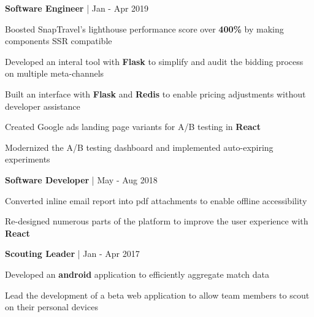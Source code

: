\begin{cventries}

\cventry
{\textbf{Software Engineer} | \color{awesome}{SnapTravel}}
{Jan - Apr 2019} %
{ %
\begin{cvitems}
\item {Boosted SnapTravel's lighthouse performance score over \textbf{400\%} by making components SSR compatible}
\item {Developed an interal tool with \textbf{Flask} to simplify and audit the bidding process on multiple meta-channels}
\item {Built an interface with \textbf{Flask} and \textbf{Redis} to enable pricing adjustments without developer assistance}
\item {Created Google ads landing page variants for A/B testing in \textbf{React}}
\item {Modernized the A/B testing dashboard and implemented auto-expiring experiments}
\end{cvitems}
}


\cventry
{\textbf{Software Developer} | \color{awesome}{TemboSocial}}
{May - Aug 2018} %
{ %
\begin{cvitems}
\item {Converted inline email report into pdf attachments to enable offline accessibility}
\item {Re-designed numerous parts of the platform to improve the user experience with \textbf{React}}
\end{cvitems}
}


\cventry
{\textbf{Scouting Leader} | \color{awesome}{FRC Team 610}}
{Jan - Apr 2017} %
{ %
\begin{cvitems}
\item {Developed an \textbf{android} application to efficiently aggregate match data}
\item {Lead the development of a beta web application to allow team members to scout on their personal devices}
\end{cvitems}
}


\end{cventries}
